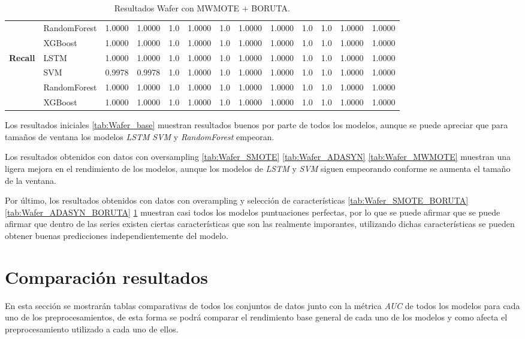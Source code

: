 \begin{table}[h]
\begin{adjustbox}{max width=13cm}
\begin{tabular}{|c|l|r|r|r|r|r|r|r|r|r|r|r|}
			& RandomForest &  1.0000 &  1.0000 &  1.0 &  1.0000 &  1.0 &  1.0000 &  1.0000 &  1.0 &  1.0 &  1.0000 &  1.0000 \\
			& XGBoost &  1.0000 &  1.0000 &  1.0 &  1.0000 &  1.0 &  1.0000 &  1.0000 &  1.0 &  1.0 &  1.0000 &  1.0000 \\
			\hline
			\textbf{Recall} & LSTM &  1.0000 &  1.0000 &  1.0 &  1.0000 &  1.0 &  1.0000 &  1.0000 &  1.0 &  1.0 &  1.0000 &  1.0000 \\
			& SVM &  0.9978 &  0.9978 &  1.0 &  1.0000 &  1.0 &  1.0000 &  1.0000 &  1.0 &  1.0 &  1.0000 &  1.0000 \\
			& RandomForest &  1.0000 &  1.0000 &  1.0 &  1.0000 &  1.0 &  1.0000 &  1.0000 &  1.0 &  1.0 &  1.0000 &  1.0000 \\
			& XGBoost &  1.0000 &  1.0000 &  1.0 &  1.0000 &  1.0 &  1.0000 &  1.0000 &  1.0 &  1.0 &  1.0000 &  1.0000 \\
			\hline
		\end{tabular}
	\end{adjustbox}
	\caption{Resultados Wafer con MWMOTE + BORUTA.}
	\label{tab:Wafer_MWMOTE_BORUTA}
\end{table}

\newpage

Los resultados iniciales \ref{tab:Wafer_base} muestran resultados buenos por parte de todos los modelos, aunque se puede apreciar que para tamaños de ventana los modelos \textit{LSTM} \textit{SVM} y \textit{RandomForest} empeoran.\newline

Los resultados obtenidos con datos con oversampling \ref{tab:Wafer_SMOTE} \ref{tab:Wafer_ADASYN} \ref{tab:Wafer_MWMOTE} muestran una ligera mejora en el rendimiento de los modelos, aunque los modelos de \textit{LSTM} y \textit{SVM} siguen empeorando conforme se aumenta el tamaño de la ventana.\newline

Por último, los resultados obtenidos con datos con overampling y selección de características \ref{tab:Wafer_SMOTE_BORUTA} \ref{tab:Wafer_ADASYN_BORUTA} \ref{tab:Wafer_MWMOTE_BORUTA} muestran casi todos los modelos puntuaciones perfectas, por lo que se puede afirmar que se puede afirmar que dentro de las series existen ciertas características que son las realmente imporantes, utilizando dichas características se pueden obtener buenas predicciones independientemente del modelo.\newline

\section{Comparación resultados}
En esta sección se mostrarán tablas comparativas de todos los conjuntos de datos junto con la métrica \textit{AUC} de todos los modelos para cada uno de los preprocesamientos, de esta forma se podrá comparar el rendimiento base general de cada uno de los modelos y como afecta el preprocesamiento utilizado a cada uno de ellos.\newline


